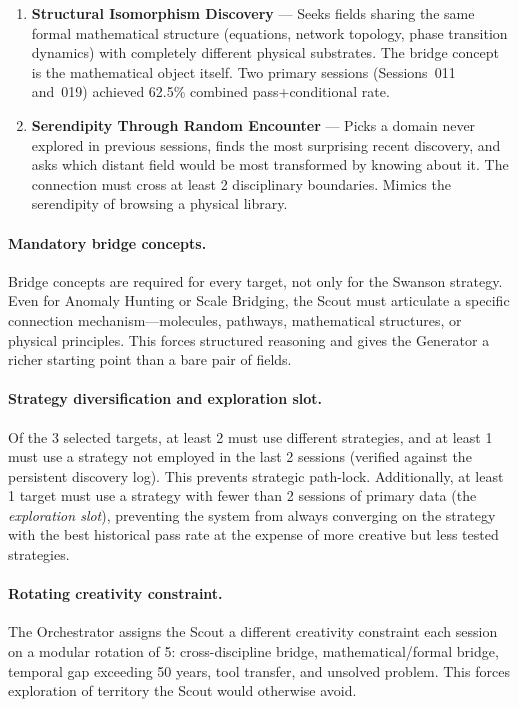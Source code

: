\begin{enumerate}
    \item \textbf{Structural Isomorphism Discovery} --- Seeks fields sharing the same formal mathematical structure (equations, network topology, phase transition dynamics) with completely different physical substrates. The bridge concept is the mathematical object itself. Two primary sessions (Sessions~011 and~019) achieved 62.5\% combined pass+conditional rate.

    \item \textbf{Serendipity Through Random Encounter} --- Picks a domain never explored in previous sessions, finds the most surprising recent discovery, and asks which distant field would be most transformed by knowing about it. The connection must cross at least 2 disciplinary boundaries. Mimics the serendipity of browsing a physical library.
\end{enumerate}

\paragraph{Mandatory bridge concepts.} Bridge concepts are required for every target, not only for the Swanson strategy. Even for Anomaly Hunting or Scale Bridging, the Scout must articulate a specific connection mechanism---molecules, pathways, mathematical structures, or physical principles. This forces structured reasoning and gives the Generator a richer starting point than a bare pair of fields.

\paragraph{Strategy diversification and exploration slot.} Of the 3 selected targets, at least 2 must use different strategies, and at least 1 must use a strategy not employed in the last 2 sessions (verified against the persistent discovery log). This prevents strategic path-lock. Additionally, at least 1 target must use a strategy with fewer than 2 sessions of primary data (the \emph{exploration slot}), preventing the system from always converging on the strategy with the best historical pass rate at the expense of more creative but less tested strategies.

\paragraph{Rotating creativity constraint.} The Orchestrator assigns the Scout a different creativity constraint each session on a modular rotation of 5: cross-discipline bridge, mathematical/formal bridge, temporal gap exceeding 50 years, tool transfer, and unsolved problem. This forces exploration of territory the Scout would otherwise avoid.

